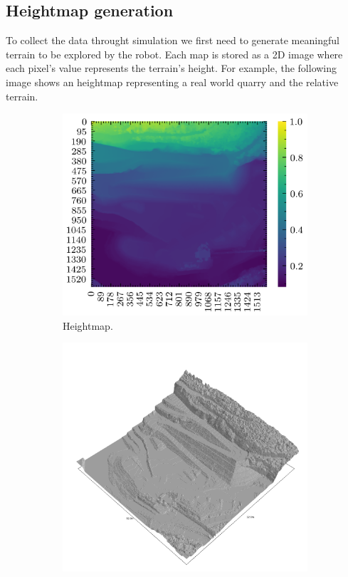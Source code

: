 \documentclass[../document.tex]{subfiles}
\begin{document}
\subsection{Heightmap generation}
\label{subsec: heightmap-generation}
To collect the data throught simulation we first need to generate meaningful terrain to be explored by the robot. Each map is stored as a 2D image where each pixel's value represents the terrain's height. For example, the following image shows an heightmap representing a real world quarry and the relative terrain.
\begin{figure}[htbp]
    \centering
        \begin{subfigure}[b]{0.45\textwidth}
            \includegraphics[width=\textwidth]{../img/hm/querry-big-10.png}
            \caption{Heightmap.}
        \end{subfigure}
        \begin{subfigure}[b]{0.45\linewidth}
            \includegraphics[width=\textwidth]{../img/hm3d_borders/querry-big-10.png}

\end{subfigure}
\end{figure}
\end{document}
